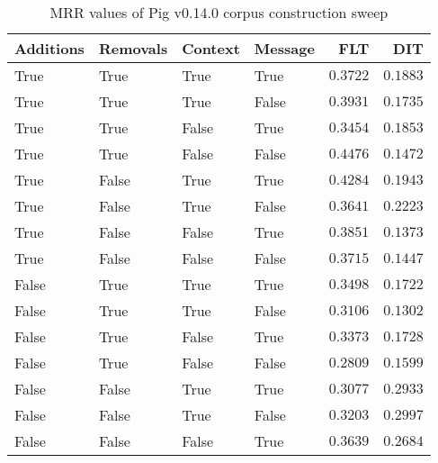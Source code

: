 
\begin{table}
\begin{spacing}{1.2}
\centering
\caption{MRR values of Pig v0.14.0 corpus construction sweep}
\label{table:pig_corpus_sweep}
\vspace{0.2em}
\begin{tabular}{llll|rr}
\toprule
Additions & Removals & Context & Message & FLT &        DIT \\
\midrule
     True &     True &    True &    True &         $0.3722$ &      $0.1883$ \\
     True &     True &    True &   False &         $0.3931$ &      $0.1735$ \\
     True &     True &   False &    True &         $0.3454$ &      $0.1853$ \\
     True &     True &   False &   False &    $\bm{0.4476}$ &      $0.1472$ \\
     True &    False &    True &    True &         $0.4284$ &      $0.1943$ \\
     True &    False &    True &   False &         $0.3641$ &      $0.2223$ \\
     True &    False &   False &    True &         $0.3851$ &      $0.1373$ \\
     True &    False &   False &   False &         $0.3715$ &      $0.1447$ \\
    False &     True &    True &    True &         $0.3498$ &      $0.1722$ \\
    False &     True &    True &   False &         $0.3106$ &      $0.1302$ \\
    False &     True &   False &    True &         $0.3373$ &      $0.1728$ \\
    False &     True &   False &   False &         $0.2809$ &      $0.1599$ \\
    False &    False &    True &    True &         $0.3077$ &      $0.2933$ \\
    False &    False &    True &   False &         $0.3203$ & $\bm{0.2997}$ \\
    False &    False &   False &    True &         $0.3639$ &      $0.2684$ \\
\bottomrule
\end{tabular}

\end{spacing}
\end{table}
